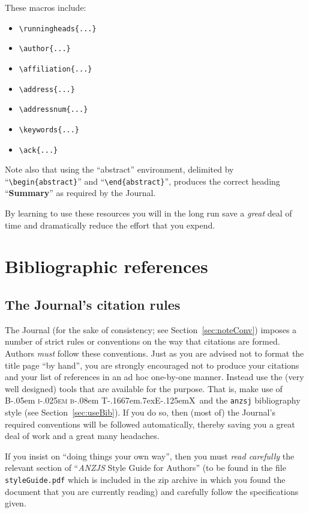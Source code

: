 \documentclass[times, doublespace]{anzsauth}
\newcommand\BibTeX{{\rmfamily B\kern-.05em \textsc{i\kern-.025em b}\kern-.08em
T\kern-.1667em\lower.7ex\hbox{E}\kern-.125emX}}
\begin{document}
These macros include:
\begin{itemize}
\item \verb!\runningheads{...}!
\item \verb!\author{...}!
\item \verb!\affiliation{...}!
\item \verb!\address{...}!
\item \verb!\addressnum{...}!
\item \verb!\keywords{...}!
\item \verb!\ack{...}!
\end{itemize}
Note also that using the ``abstract'' environment, delimited by
``\verb!\begin{abstract}!'' and ``\verb!\end{abstract}!'',
produces the correct heading ``\textbf{Summary}'' as required by
the Journal.

By learning to use these resources you will in the long
run save a \emph{great} deal of time and dramatically reduce the
effort that you expend.

\section{Bibliographic references}
\label{sec:bibRef}

\subsection{The Journal's citation rules}
\label{sec:citeRules}

The Journal (for the sake of consistency; see
Section~\ref{sec:noteConv}) imposes a number of strict rules
or conventions on the way that citations are formed.  Authors
\emph{must} follow these conventions.  Just as you are advised not
to format the title page ``by hand'', you are strongly encouraged not
to produce your citations and your list of references in an ad hoc
one-by-one manner.  Instead use the (very well designed) tools that
are available for the purpose.  That is, make use of \BibTeX\ and
the \texttt{anzsj} bibliography style (see Section~\ref{sec:useBib}).
If you do so, then (most of) the Journal's required conventions will
be followed automatically, thereby saving you a great deal of work
and a great many headaches.

If you insist on ``doing things your own way'',
then you must \emph{read carefully} the relevant section of
``\textit{ANZJS} Style Guide for Authors'' (to be found in the
file \texttt{styleGuide.pdf} which is included in the zip archive
in which you found the document that you are currently reading)
and carefully follow the specifications given.
\end{document}
